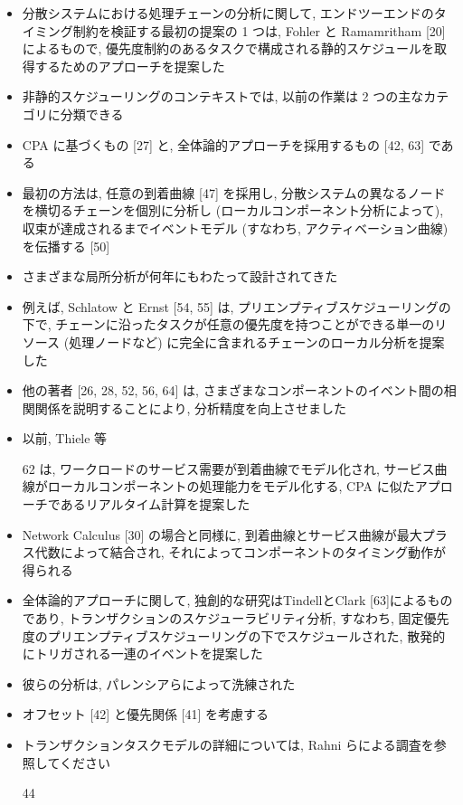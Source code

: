 \begin{frame}{}
    \begin{itemize}
        \item 分散システムにおける処理チェーンの分析に関して, エンドツーエンドのタイミング制約を検証する最初の提案の 1 つは, Fohler と Ramamritham [20] によるもので, 優先度制約のあるタスクで構成される静的スケジュールを取得するためのアプローチを提案した
\item 非静的スケジューリングのコンテキストでは, 以前の作業は 2 つの主なカテゴリに分類できる
\item CPA に基づくもの [27] と, 全体論的アプローチを採用するもの [42, 63] である
\item 最初の方法は, 任意の到着曲線 [47] を採用し, 分散システムの異なるノードを横切るチェーンを個別に分析し (ローカルコンポーネント分析によって), 収束が達成されるまでイベントモデル (すなわち, アクティベーション曲線) を伝播する [50]
\item さまざまな局所分析が何年にもわたって設計されてきた
    \end{itemize}
\end{frame}

\begin{frame}{}
    \begin{itemize}
        \item 例えば, Schlatow と Ernst [54, 55] は, プリエンプティブスケジューリングの下で, チェーンに沿ったタスクが任意の優先度を持つことができる単一のリソース (処理ノードなど) に完全に含まれるチェーンのローカル分析を提案した
\item 他の著者 [26, 28, 52, 56, 64] は, さまざまなコンポーネントのイベント間の相関関係を説明することにより, 分析精度を向上させました
\item 以前, Thiele 等
\item [62] は, ワークロードのサービス需要が到着曲線でモデル化され, サービス曲線がローカルコンポーネントの処理能力をモデル化する, CPA に似たアプローチであるリアルタイム計算を提案した
\item Network Calculus [30] の場合と同様に, 到着曲線とサービス曲線が最大プラス代数によって結合され, それによってコンポーネントのタイミング動作が得られる
\item 全体論的アプローチに関して, 独創的な研究はTindellとClark [63]によるものであり, トランザクションのスケジューラビリティ分析, すなわち, 固定優先度のプリエンプティブスケジューリングの下でスケジュールされた, 散発的にトリガされる一連のイベントを提案した
\item 彼らの分析は, パレンシアらによって洗練された
\item オフセット [42] と優先関係 [41] を考慮する
\item トランザクションタスクモデルの詳細については, Rahni らによる調査を参照してください
\item [44]
    \end{itemize}
\end{frame}

